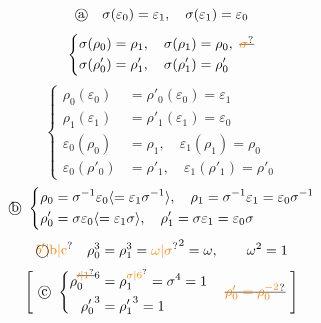 \[\text{\textcircled{a}}\quad \sigma(\varepsilon_0)=\varepsilon_1,\quad \sigma(\varepsilon_1)=\varepsilon_0\]
\[\left\{\begin{aligned}\sigma(\rho_0)&=\rho_1,\quad \sigma(\rho_1)=\rho_0,\ \deleted{\unsure{\sigma}}\\\sigma(\rho'_0)&=\rho'_1,\quad \sigma(\rho'_1)=\rho'_0\end{aligned}\right.\]
\[\left\{\begin{aligned}
\rho_0(\varepsilon_0)&=\rho'_0(\varepsilon_0)=\varepsilon_1\\
\rho_1(\varepsilon_1)&=\rho'_1(\varepsilon_1)=\varepsilon_0\\
\varepsilon_0(\rho_0)&=\rho_1,\quad \varepsilon_1(\rho_1)=\rho_0\\
\varepsilon_0(\rho'_0)&=\rho'_1,\quad \varepsilon_1(\rho'_1)=\rho'_0
\end{aligned}\right.\]
\[\text{\textcircled{b}}\ \left\{\begin{aligned}
\rho_0&=\sigma^{-1}\varepsilon_0\inserted{=\varepsilon_1\sigma^{-1}},\quad \rho_1=\sigma^{-1}\varepsilon_1=\varepsilon_0\sigma^{-1}\\
\rho'_0&=\sigma \varepsilon_0\inserted{=\varepsilon_1\sigma},\quad \rho'_1=\sigma \varepsilon_1=\varepsilon_0\sigma
\end{aligned}\right.\]
\[\text{\textcircled{\unsure{$b'$|b|c}}}\quad \rho_0^3=\rho_1^3=\unsure{\omega|\sigma}^2=\omega,\qquad \omega^2=1\]
\[\left[\ \text{\textcircled{c}}\ \left\{\begin{aligned}\rho_0^{\deleted{\unsure{\prime|1}}6}&=\rho_1^{\unsure{\sigma|6}}=\sigma^4=1\\{\rho'_0}^{3}&={\rho'_1}^{3}=1\end{aligned}\right.\quad \deleted{\unsure{\rho'_0=\rho_0^{-2}}}\ \right]\]
